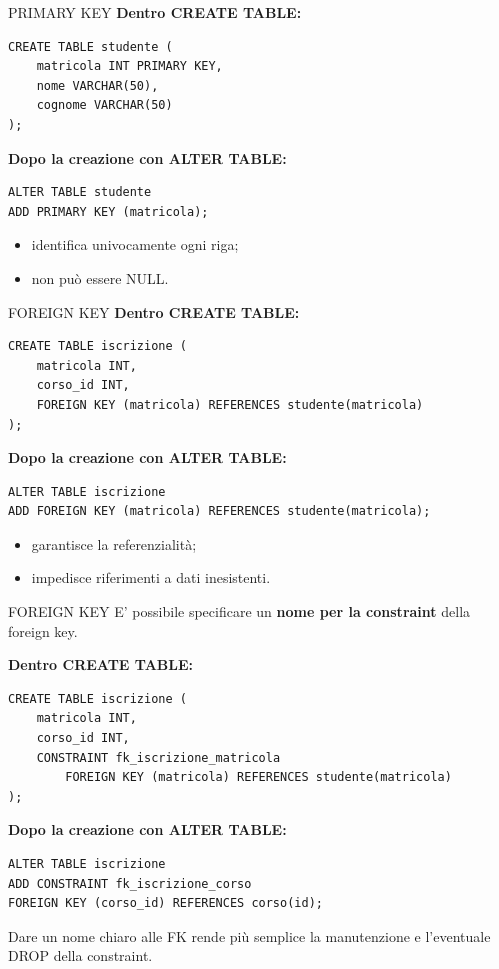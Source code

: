 \documentclass{beamer}
\begin{document}
\begin{frame}[fragile]{PRIMARY KEY}
\small
\textbf{Dentro CREATE TABLE:}
\begin{verbatim}
CREATE TABLE studente (
    matricola INT PRIMARY KEY,
    nome VARCHAR(50),
    cognome VARCHAR(50)
);
\end{verbatim}

\textbf{Dopo la creazione con ALTER TABLE:}
\begin{verbatim}
ALTER TABLE studente
ADD PRIMARY KEY (matricola);
\end{verbatim}

\medskip
\begin{itemize}
    \item identifica univocamente ogni riga;
    \item non può essere NULL.
\end{itemize}
\end{frame}

\begin{frame}[fragile]{FOREIGN KEY}
\small
\textbf{Dentro CREATE TABLE:}
\begin{verbatim}
CREATE TABLE iscrizione (
    matricola INT,
    corso_id INT,
    FOREIGN KEY (matricola) REFERENCES studente(matricola)
);
\end{verbatim}

\textbf{Dopo la creazione con ALTER TABLE:}
\begin{verbatim}
ALTER TABLE iscrizione
ADD FOREIGN KEY (matricola) REFERENCES studente(matricola);
\end{verbatim}

\medskip
\begin{itemize}
    \item garantisce la referenzialità;
    \item impedisce riferimenti a dati inesistenti.
\end{itemize}
\end{frame}

\begin{frame}[fragile]{FOREIGN KEY}
\small
E' possibile specificare un \textbf{nome per la constraint} della foreign key.

\medskip
\textbf{Dentro CREATE TABLE:}
\begin{verbatim}
CREATE TABLE iscrizione (
    matricola INT,
    corso_id INT,
    CONSTRAINT fk_iscrizione_matricola
        FOREIGN KEY (matricola) REFERENCES studente(matricola)
);
\end{verbatim}

\textbf{Dopo la creazione con ALTER TABLE:}
\begin{verbatim}
ALTER TABLE iscrizione
ADD CONSTRAINT fk_iscrizione_corso
FOREIGN KEY (corso_id) REFERENCES corso(id);
\end{verbatim}

Dare un nome chiaro alle FK rende più semplice la manutenzione e l'eventuale DROP della constraint.
\end{frame}
\end{document}
